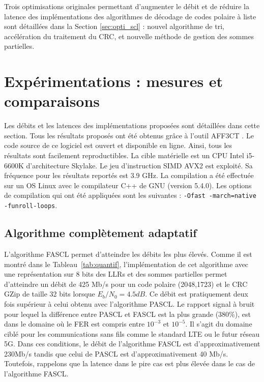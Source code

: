 Trois optimisations originales permettant d'augmenter le débit et de réduire la latence des implémentations des algorithmes de décodage de codes polaire à liste sont détaillées dans la Section \ref{sec:opti_scl} : nouvel algorithme de tri, accélération du traitement du CRC, et nouvelle méthode de gestion des sommes partielles.




\section{Expérimentations : mesures et comparaisons}
\label{sec:exp_scl}

Les débits et les latences des implémentations proposées sont détaillées dans cette section. Tous les résultats proposés ont été obtenus grâce à l'outil AFF3CT \cite{aff3ct_aff3ct:_2016}. Le code source de ce logiciel est ouvert et disponible en ligne. Ainsi, tous les résultats sont facilement reproductibles. La cible matérielle est un CPU Intel i5-6600K d'architecture Skylake. Le jeu d'instruction SIMD AVX2 est exploité. Sa fréquence pour les résultats reportés est 3.9 GHz. La compilation a été effectuée sur un OS Linux avec le compilateur C++ de GNU (version 5.4.0). Les options de compilation qui ont été appliquées sont les suivantes : \texttt{-Ofast -march=native -funroll-loops}.

\subsection{Algorithme complètement adaptatif}
L'algorithme FASCL permet d'atteindre les débits les plus élevés. Comme il est montré dans le Tableau~\ref{tab:quantif}, l'implémentation de cet algorithme avec une représentation sur 8 bits des LLRs et des sommes partielles permet d'atteindre un débit de 425 Mb/s pour un code polaire (2048,1723) et le CRC GZip de taille 32 bits lorsque $E_b/N_0=4.5dB$. Ce débit est pratiquement deux fois supérieur à celui obtenu avec l'algorithme PASCL. Le rapport signal à bruit pour lequel la différence entre PASCL et FASCL est la plus grande (380\%), est dans le domaine où le FER est compris entre $10^{-3}$ et $10^{-5}$. Il s'agit du domaine ciblé pour les communications sans fils comme le standard LTE ou le futur réseau 5G. Dans ces conditions, le débit de l'algorithme FASCL est d'approximativement 230Mb/s tandis que celui de PASCL est d'approximativement 40 Mb/s. Toutefois, rappelons que la latence dans le pire cas est plus élevée dans le cas de l'algorithme FASCL.

